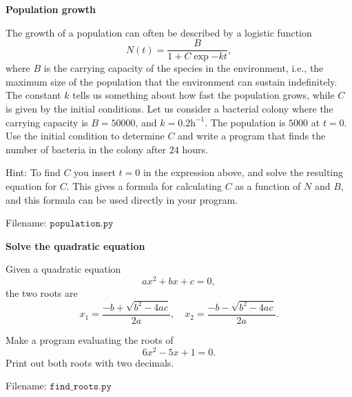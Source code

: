 \begin{Problem}{\textbf{Population growth}}\label{prob13}

\noindent The growth of a population can often be described by a logistic function
\begin{equation*}
N(t) = \frac{B}{1 + C \exp{-kt}},
\end{equation*}
where $B$ is the carrying capacity of the species in the environment, i.e., the
maximum size of the population that the environment can sustain indefinitely.
The constant $k$ tells us something about how fast the population grows, while $C$ is given
by the initial conditions. Let us consider a bacterial colony where the carrying
capacity is $B = 50 000$, and $k = 0.2\mathrm{h^{-1}}$. The population is
$5000$ at $t = 0$. Use the initial condition to determine $C$
and write a program that finds the number of bacteria in the colony after $24$ hours.

Hint: To find $C$ you insert $t=0$ in the expression above, and solve the resulting
equation for $C$. This gives a formula for calculating $C$ as a function of $N$ and
$B$, and this formula can be used directly in your program.

Filename: $\texttt{population.py}$
\end{Problem}

\newpage
\begin{Problem}{\textbf{Solve the quadratic equation}}\label{prob13}

\noindent Given a quadratic equation
\begin{equation*}
ax^2 +bx + c = 0,
\end{equation*}
the two roots are
\begin{equation*}
x_1 = \frac{-b + \sqrt{b^2 - 4ac}}{2a}, \quad x_2 = \frac{-b - \sqrt{b^2 - 4ac}}{2a}.
\end{equation*}

Make a program evaluating the roots of
\begin{equation*}
6x^2 - 5x + 1 = 0.
\end{equation*}
Print out both roots with two decimals.

Filename: $\texttt{find\_roots.py}$
\end{Problem}

